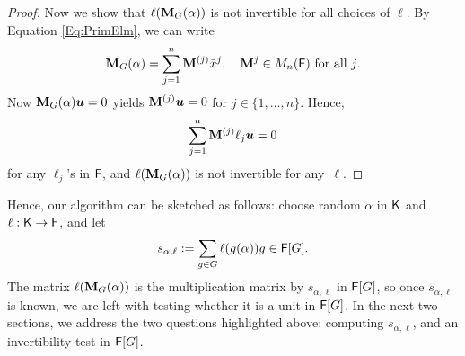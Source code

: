 \begin{proof}
  Now we show that $\ell(\mat M_G(\alpha))$ is not invertible for all
  choices of $\ell$. By Equation \eqref{Eq:PrimElm}, we can write
  $$\mat M_G(\alpha) = \sum_{j = 1}^n \mat M^{(j)} \xbar^j, \quad 
  \mat M^{j} \in M_{n}(\F) \text{~for all $j$}.$$ Now
  $\mat M_G(\alpha) \boldsymbol{u} =0$ yields
  $\mat M^{(j)}\boldsymbol{u} = 0$ for
  $j \in \lbrace 1, \ldots , n \rbrace$. Hence,
$$\sum_{j = 1}^n \mat M^{(j)} \ell_j \boldsymbol{u} = 0$$ for any 
$\ell_j$'s in ${\mathsf{F}}$, and $\ell(\mat M_G(\alpha))$ is not invertible for any~$\ell$.
\end{proof} 
Hence, our algorithm can be sketched as follows: choose random
$\alpha$ in ${\mathsf{K}}$ and $\ell: {\mathsf{K}}\to{\mathsf{F}}$, and let
$$s_{\alpha,\ell}:=\sum_{g \in G} \ell(g(\alpha))g \in {\mathsf{F}}[G].$$ The
matrix $\ell(\mat M_G (\alpha))$ is the multiplication matrix by
$s_{\alpha,\ell}$ in ${\mathsf{F}}[G]$, so once $s_{\alpha,\ell}$ is known, we
are left with testing whether it is a unit in ${\mathsf{F}}[G]$.
In the next two sections, we address the two questions highlighted above:
computing $s_{\alpha,\ell}$, and an invertibility test in ${\mathsf{F}}[G]$.


